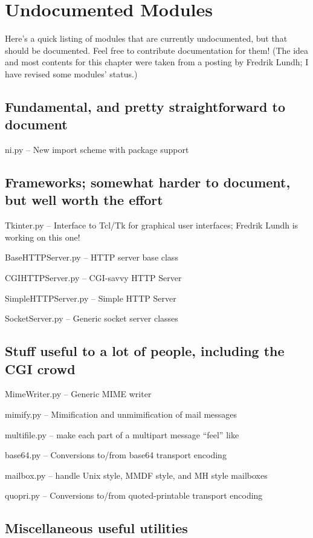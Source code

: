 \chapter{Undocumented Modules}

Here's a quick listing of modules that are currently undocumented, but
that should be documented.  Feel free to contribute documentation for
them!  (The idea and most contents for this chapter were taken from a
posting by Fredrik Lundh; I have revised some modules' status.)


\section{Fundamental, and pretty straightforward to document}

ni.py -- New import scheme with package support


\section{Frameworks; somewhat harder to document, but
well worth the effort}

Tkinter.py -- Interface to Tcl/Tk for graphical user interfaces;
Fredrik Lundh is working on this one!

BaseHTTPServer.py -- HTTP server base class

CGIHTTPServer.py -- CGI-savvy HTTP Server

SimpleHTTPServer.py -- Simple HTTP Server

SocketServer.py -- Generic socket server classes


\section{Stuff useful to a lot of people, including the CGI crowd}

MimeWriter.py -- Generic MIME writer

mimify.py -- Mimification and unmimification of mail messages

multifile.py -- make each part of a multipart message ``feel'' like

base64.py -- Conversions to/from base64 transport encoding

mailbox.py -- handle Unix style, MMDF style, and MH style mailboxes

quopri.py -- Conversions to/from quoted-printable transport encoding


\section{Miscellaneous useful utilities}

